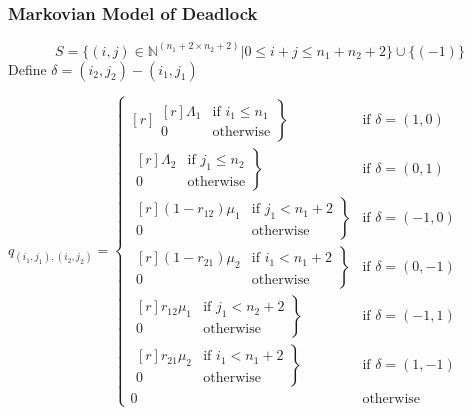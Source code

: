 \documentclass{beamer}
\begin{document}
\begin{frame}
    \begin{figure}
    
    \end{figure}
\end{frame}

\begin{frame}
    \frametitle{Markovian Model of Deadlock}
    \newline
\end{frame}

\begin{frame}
\center
\scriptsize \[S = \{(i,j)\in\mathbb{N}^{(n_1+2\times n_2+2)}| 0 \leq i + j \leq n_1 + n_2 + 2\}\cup\{(-1)\}\]
Define $\delta = (i_2, j_2) - (i_1, j_1)$\newline

  $q_{(i_1, j_1),(i_2, j_2)} = \left\{
  \begin{matrix*}[ r ]
    \left. \begin{matrix*}[ r ]
      \Lambda_1 & \text{if } i_1 \leq n_1 \\
      0 & \text{otherwise}
    \end{matrix*} \right\} & \text{if } \delta = (1, 0) \\
    \left. \begin{matrix*}[ r ]
      \Lambda_2 & \text{if } j_1 \leq n_2 \\
      0 & \text{otherwise}
    \end{matrix*} \right\} & \text{if } \delta = (0, 1) \\
    \left. \begin{matrix*}[ r ]
      (1 - r_{12})\mu_1 & \text{if } j_1 < n_1 + 2 \\
      0 & \text{otherwise}
    \end{matrix*} \right\} & \text{if } \delta = (-1, 0) \\
    \left. \begin{matrix*}[ r ]
      (1 - r_{21})\mu_2 & \text{if } i_1 < n_1 + 2 \\
      0 & \text{otherwise}
    \end{matrix*} \right\} & \text{if } \delta = (0, -1) \\
    \left. \begin{matrix*}[ r ]
      r_{12}\mu_1 & \text{if } j_1 < n_2 + 2 \\
      0 & \text{otherwise}
    \end{matrix*} \right\} & \text{if } \delta = (-1, 1) \\
    \left. \begin{matrix*}[ r ]
      r_{21}\mu_2 & \text{if } i_1 < n_1 + 2 \\
      0 & \text{otherwise}
    \end{matrix*} \right\} & \text{if } \delta = (1, -1) \\
    0 & \text{otherwise}
  \end{matrix*} \right.$\newline\newline


\end{frame}
\end{document}
